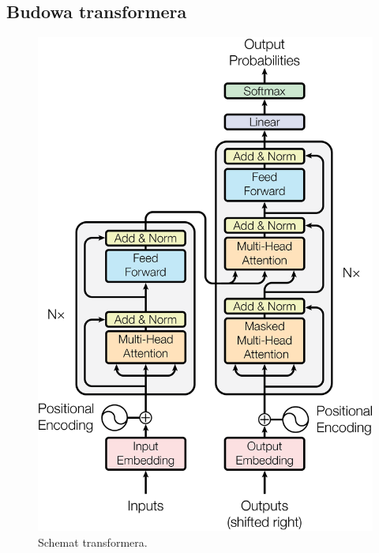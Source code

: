 \documentclass[data-science]{agh-wi} %
\begin{document}
\subsection{Budowa transformera}
\begin{figure}[!ht]
    \begin{center}
        \includegraphics[width=0.7\linewidth]{img/transformer1}
    \end{center}
    \caption{Schemat transformera.}
    \label{fig:transformer1}
\end{figure}
\end{document}
